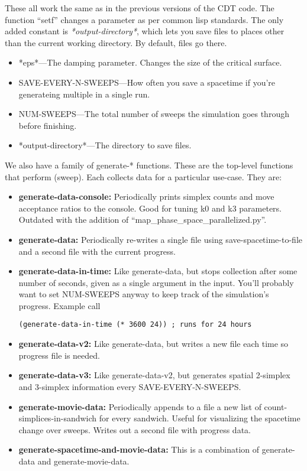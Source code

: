 \documentclass{article}
\begin{document}
These all work the same as in the previous versions of the CDT
code. The function ``setf'' changes a parameter as per common lisp
standards. The only added constant is \textit{*output-directory*},
which lets you save files to places other than the current working
directory. By default, files go there.
\begin{itemize}
\item *eps*---The damping parameter. Changes the size of the critical surface.
\item SAVE-EVERY-N-SWEEPS---How often you save a spacetime if you're
  generateing multiple in a single run.
\item NUM-SWEEPS---The total number of sweeps the simulation goes
  through before finishing.
\item *output-directory*---The directory to save files.
\end{itemize}

We also have a family of generate-* functions. These are the top-level
functions that perform (sweep). Each collects data for a particular
use-case. They are:
\begin{itemize}
\item \textbf{generate-data-console:} Periodically prints simplex
  counts and move acceptance ratios to the console. Good for tuning k0
  and k3 parameters. Outdated with the addition of
  ``map\_phase\_space\_parallelized.py''.
\item \textbf{generate-data:} Periodically re-writes a single file
  using save-spacetime-to-file and a second file with the current
  progress.
\item \textbf{generate-data-in-time:} Like generate-data, but stops
  collection after some number of seconds, given as a single argument
  in the input. You'll probably want to set NUM-SWEEPS anyway to keep
  track of the simulation's progress. Example call
  \begin{lstlisting}
(generate-data-in-time (* 3600 24)) ; runs for 24 hours
  \end{lstlisting}
\item \textbf{generate-data-v2:} Like generate-data, but writes a new
  file each time so progress file is needed.
\item \textbf{generate-data-v3:} Like generate-data-v2, but generates
  spatial 2-simplex and 3-simplex information every
  SAVE-EVERY-N-SWEEPS.
\item \textbf{generate-movie-data:} Periodically appends to a file a
  new list of count-simplices-in-sandwich for every sandwich. Useful
  for visualizing the spacetime change over sweeps. Writes out a
  second file with progress data.
\item \textbf{generate-spacetime-and-movie-data:} This is a
  combination of generate-data and generate-movie-data.
\end{itemize}
\end{document}
